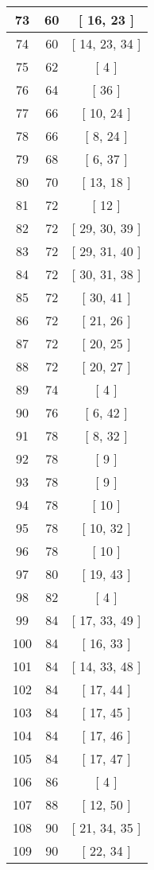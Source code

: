 \begin{center}
\begin{longtable}[H]{|| c c c ||}
73 & 60 & [ 16, 23 ] \\ 
\hline
74 & 60 & [ 14, 23, 34 ] \\ 
\hline
75 & 62 & [ 4 ] \\ 
\hline
76 & 64 & [ 36 ] \\ 
\hline
77 & 66 & [ 10, 24 ] \\ 
\hline
78 & 66 & [ 8, 24 ] \\ 
\hline
79 & 68 & [ 6, 37 ] \\ 
\hline
80 & 70 & [ 13, 18 ] \\ 
\hline
81 & 72 & [ 12 ] \\ 
\hline
82 & 72 & [ 29, 30, 39 ] \\ 
\hline
83 & 72 & [ 29, 31, 40 ] \\ 
\hline
84 & 72 & [ 30, 31, 38 ] \\ 
\hline
85 & 72 & [ 30, 41 ] \\ 
\hline
86 & 72 & [ 21, 26 ] \\ 
\hline
87 & 72 & [ 20, 25 ] \\ 
\hline
88 & 72 & [ 20, 27 ] \\ 
\hline
89 & 74 & [ 4 ] \\ 
\hline
90 & 76 & [ 6, 42 ] \\ 
\hline
91 & 78 & [ 8, 32 ] \\ 
\hline
92 & 78 & [ 9 ] \\ 
\hline
93 & 78 & [ 9 ] \\ 
\hline
94 & 78 & [ 10 ] \\ 
\hline
95 & 78 & [ 10, 32 ] \\ 
\hline
96 & 78 & [ 10 ] \\ 
\hline
97 & 80 & [ 19, 43 ] \\ 
\hline
98 & 82 & [ 4 ] \\ 
\hline
99 & 84 & [ 17, 33, 49 ] \\ 
\hline
100 & 84 & [ 16, 33 ] \\ 
\hline
101 & 84 & [ 14, 33, 48 ] \\ 
\hline
102 & 84 & [ 17, 44 ] \\ 
\hline
103 & 84 & [ 17, 45 ] \\ 
\hline
104 & 84 & [ 17, 46 ] \\ 
\hline
105 & 84 & [ 17, 47 ] \\ 
\hline
106 & 86 & [ 4 ] \\ 
\hline
107 & 88 & [ 12, 50 ] \\ 
\hline
108 & 90 & [ 21, 34, 35 ] \\ 
\hline
109 & 90 & [ 22, 34 ] \\ 

\end{longtable}
\end{center}
